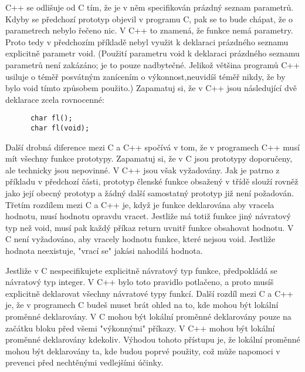 {      C++ se odlišuje od C tím, že je v něm specifikován prázdný seznam parametrů. Kdyby se 
      předchozí prototyp objevil v programu C, pak se to bude chápat, že o parametrech nebylo 
      řečeno nic. V C++ to znamená, že funkce nemá parametry. Proto tedy v předchozím příkladě 
      nebyl využit k deklaraci prázdného seznamu explicitně parametr void. (Použití parametru void 
      k deklaraci prázdného  seznamu parametrů není zakázáno; je to pouze nadbytečné. Jelikož 
      většina programů C++ usiluje o téměř posvátným zanícením o výkonnost,neuvidíš téměř nikdy, že 
      by bylo void tímto způsobem použito.) Zapamatuj si, že v C++ jsou následující dvě deklarace 
      zcela rovnocenné:
      \begin{lstlisting}
      char fl();
      char fl(void);
      \end{lstlisting}
  
      Další drobná diference mezi C a C++ spočívá v tom, že v programech C++ musí mít všechny 
      funkce prototypy. Zapamatuj si, že v C jsou prototypy doporučeny, ale technicky jsou 
      nepovinné. V C++ jsou však vyžadovány. Jak je patrno z příkladu v předchozí části, prototyp 
      členské funkce obsažený v třídě slouží rovněž jako její obecný prototyp a žádný další 
      samostatný prototyp již není požadován. Třetím rozdílem mezi C a C++ je, když je funkce 
      deklarována aby vracela hodnotu, musí hodnotu opravdu vracet. Jestliže má totiž funkce jiný 
      návratový typ než void, musí pak každý příkaz return uvnitř funkce obsahovat hodnotu. V C 
      není vyžadováno, aby vracely hodnotu funkce, které nejsou void. Jestliže hodnota neexistuje, 
      "vrací se" jakási nahodilá hodnota.
   
      Jestliže v C nespecifikujete explicitně návratový typ funkce, předpokládá se návratový typ 
      integer. V C++ bylo toto pravidlo potlačeno, a proto musíš explicitně deklarovat všechny 
      návratové typy funkcí. Další rozdíl mezi C a C++ je, že v programech C budeš muset brát ohled 
      na to, kde mohou být lokální proměnné deklarovány. V C mohou být lokální proměnné deklarovány 
      pouze na začátku bloku před všemi "výkonnými" příkazy. V C++ mohou být lokální proměnné 
      deklarovány kdekoliv. Výhodou tohoto přístupu je, že lokální proměnné mohou být deklarovány 
      ta, kde budou poprvé použity, což může napomoci v prevenci před nechtěnými vedlejšími účinky.
  
}
